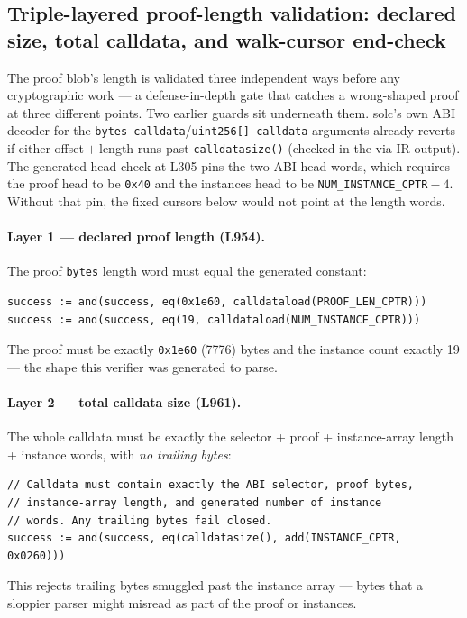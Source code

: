 \subsection{Triple-layered proof-length validation: declared size, total calldata, and walk-cursor end-check}
\label{sec:pr-prooflen}

The proof blob's length is validated three independent ways before
any cryptographic work --- a defense-in-depth gate that catches a
wrong-shaped proof at three different points. Two earlier guards
sit underneath them. solc's own ABI decoder for the
\texttt{bytes calldata}/\texttt{uint256[] calldata} arguments
already reverts if either offset${}+{}$length runs past
\texttt{calldatasize()} (checked in the via-IR output). The
generated head check at L305 pins the two ABI head words, which
requires the proof head to be \texttt{0x40} and the instances head
to be \texttt{NUM\_\allowbreak{}INSTANCE\_\allowbreak{}CPTR}${}-4$. Without that pin, the
fixed cursors below would not point at the length words.

\paragraph{Layer 1 --- declared proof length (L954).} The proof
\texttt{bytes} length word must equal the generated constant:
\begin{lstlisting}[style=yul]
success := and(success, eq(0x1e60, calldataload(PROOF_LEN_CPTR)))
success := and(success, eq(19, calldataload(NUM_INSTANCE_CPTR)))
\end{lstlisting}
The proof must be exactly \texttt{0x1e60} (7776) bytes and the
instance count exactly 19 --- the shape this verifier was generated
to parse.

\paragraph{Layer 2 --- total calldata size (L961).} The whole
calldata must be exactly the selector + proof + instance-array
length + instance words, with \emph{no trailing bytes}:
\begin{lstlisting}[style=yul]
// Calldata must contain exactly the ABI selector, proof bytes,
// instance-array length, and generated number of instance
// words. Any trailing bytes fail closed.
success := and(success, eq(calldatasize(), add(INSTANCE_CPTR, 0x0260)))
\end{lstlisting}
This rejects trailing bytes smuggled past the instance array ---
bytes that a sloppier parser might misread as part of the proof or
instances.


